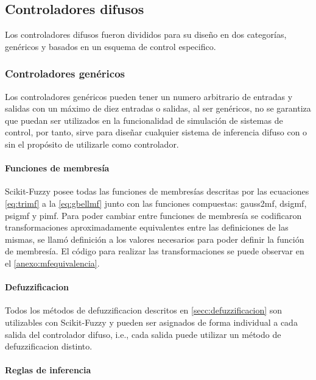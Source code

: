     \subsection{Controladores difusos}

        Los controladores difusos fueron divididos para su diseño en dos categorías, genéricos y basados en un esquema de control especifico.
        
        \subsubsection{Controladores genéricos}

            Los controladores genéricos pueden tener un numero arbitrario de entradas y salidas con un máximo de diez entradas o salidas, al ser genéricos, no se garantiza que puedan ser utilizados en la funcionalidad de simulación de sistemas de control, por tanto, sirve para diseñar cualquier sistema de inferencia difuso con o sin el propósito de utilizarle como controlador.

            \paragraph{Funciones de membresía}

                Scikit-Fuzzy posee todas las funciones de membresías descritas por las ecuaciones \cref{eq:trimf} a la \cref{eq:gbellmf} junto con las funciones compuestas: gauss2mf, dsigmf, psigmf y pimf. Para poder cambiar entre funciones de membresía se codificaron transformaciones aproximadamente equivalentes entre las definiciones de las mismas, se llamó definición a los valores necesarios para poder definir la función de membresía. El código para realizar las transformaciones se puede observar en el \ref{anexo:mfequivalencia}.

            \paragraph{Defuzzificacion}

                Todos los métodos de defuzzificacion descritos en \cref{secc:defuzzificacion} son utilizables con Scikit-Fuzzy y pueden ser asignados de forma individual a cada salida del controlador difuso, i.e., cada salida puede utilizar un método de defuzzificacion distinto.

            \paragraph{Reglas de inferencia}

